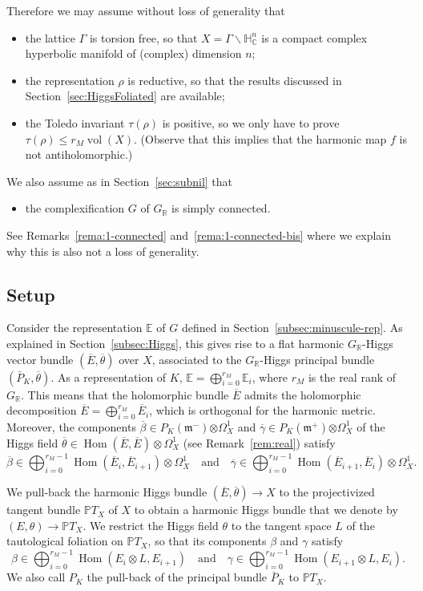 \documentclass[JEP,XML,SOM,Unicode,NoFloatCountersInSection]{cedram}
\theoremstyle{plain}
\theoremstyle{definition}
\let\ov\overline
\DeclareMathOperator{\Hom}{Hom}
\DeclareMathOperator{\vol}{vol}
\newcommand{\bE}{\mathbb{E}}
\newcommand{\bR}{\mathbb{R}}
\newcommand{\HC}{{\mathbb{H}^n_\mathbb{C}}}
\newcommand{\PTX}{{\mathbb{P}T_X}}
\newcommand{\fm}{\mathfrak{m}}
\newcommand{\rkm}{{r_M}}
\newcommand{\ovE}{\ov{E}}
\newcommand{\ovb}{\ov{\beta}}
\newcommand{\ovg}{\ov{\gamma}}
\newcommand{\ovt}{\ov{\theta}}
\begin{document}
Therefore we may assume without loss of generality that
\begin{itemize}
\item the lattice $\Gamma$ is torsion free, so that $X=\Gamma\backslash\HC$ is a compact
complex hyperbolic manifold of (complex) dimension $n$;
\item the representation $\rho$ is reductive, so that the results discussed in
Section~\ref{sec:HiggsFoliated} are available;
\item the Toledo invariant $\tau(\rho)$ is positive, so we only have to prove
\hbox{$\tau(\rho)\!\leq\!\rkm\vol(X)$}. (Observe that this implies that the harmonic map $f$ is not
antiholomorphic.)
\end{itemize}
We also assume as in Section~\ref{sec:subnil} that
\begin{itemize}
\item the complexification $G$ of $G_\bR$ is simply connected.
\end{itemize}
See Remarks~\ref{rema:1-connected} and~\ref{rema:1-connected-bis} where we explain why this is also
not a loss of generality.

\subsection{Setup}\label{subsec:setup}

Consider the representation $\bE$ of $G$ defined in Section~\ref{subsec:minuscule-rep}. As \hbox{explained}
in Section~\ref{subsec:Higgs}, this gives rise to a flat
harmonic $G_\bR$-Higgs vector bundle $(\ovE,\ovt)$ over $X$, associated to the $G_\bR$-Higgs principal
bundle $(\bar{P}_K,\ovt)$.
As a representation of $K$, $\bE=\bigoplus_{i=0}^\rkm\bE_{i}$, where $\rkm$ is the real rank of $G_\bR$. This
means that the holomorphic bundle $\ovE$ admits the holomorphic decomposition
$\ovE=\bigoplus_{i=0}^\rkm \ovE_{i}$, which is orthogonal for the harmonic metric. Moreover,
the components $\ovb\in P_K(\fm^-){\otimes\Omega^1_X}$ and $\ovg\in P_K(\fm^+){\otimes\Omega^1_X}$ of
the Higgs field $\ovt\in \Hom(\ovE,\ovE)\otimes\Omega^1_X$ (see Remark~\ref{rem:real}) satisfy
$$
\ovb\in\bigoplus_{i=0}^{\rkm-1}\Hom(\ovE_{i},\ovE_{i+1})\otimes \Omega^1_X\quad\mbox{and}\quad
\ovg\in\bigoplus_{i=0}^{\rkm-1}\Hom(\ovE_{i+1},\ovE_{i})\otimes \Omega^1_X.
$$

We pull-back the harmonic Higgs bundle $(\ovE,\ovt)\to X$ to the projectivized tangent bundle
$\PTX$ of $X$ to obtain a harmonic Higgs bundle that
we denote by $(E,\theta)\to\PTX$. We restrict the Higgs field $\theta$ to the tangent space $L$ of the tautological
foliation on
$\PTX$, so that its components $\beta$ and $\gamma$ satisfy
$$
\beta\in\bigoplus_{i=0}^{\rkm-1}\Hom(E_{i}\otimes L, E_{i+1})\quad\mbox{and}\quad
\gamma\in\bigoplus_{i=0}^{\rkm-1}\Hom(E_{i+1}\otimes L, E_{i}).
$$
We also call $P_K$ the pull-back of the principal bundle $\bar P_K$ to $\PTX$.
\end{document}
